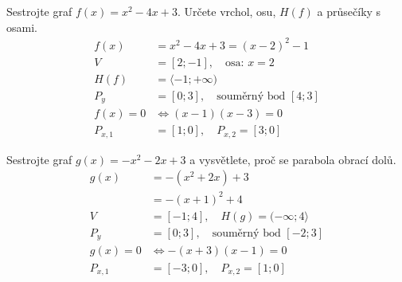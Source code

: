 \documentclass[11pt,a4paper]{article}
\begin{document}
\begin{prikladReseniBox}[title={Příklad 1}]
Sestrojte graf $f(x)=x^2-4x+3$. Určete vrchol, osu, $H(f)$ a průsečíky s osami.
\tcblower
\[
\begin{aligned}
f(x)&=x^2-4x+3=(x-2)^2-1 \\
V&=[2;-1],\quad\text{osa: }x=2 \\
H(f)&=\langle-1;+\infty) \\
P_y&=[0;3],\quad \text{souměrný bod }[4;3] \\
f(x)=0&\iff(x-1)(x-3)=0 \\
P_{x,1}&=[1;0],\quad P_{x,2}=[3;0]
\end{aligned}
\]

\end{prikladReseniBox}
\begin{center}
\end{center}
\begin{prikladReseniBox}[title={Příklad 2}]
Sestrojte graf $g(x)=-x^2-2x+3$ a vysvětlete, proč se parabola obrací dolů.
\tcblower
\[
\begin{aligned}
g(x)&=-(x^2+2x)+3 \\
&=-(x+1)^2+4 \\
V&=[-1;4],\quad H(g)=(-\infty;4\rangle \\
P_y&=[0;3],\quad\text{souměrný bod }[-2;3] \\
g(x)=0&\iff -(x+3)(x-1)=0 \\
P_{x,1}&=[-3;0],\quad P_{x,2}=[1;0]
\end{aligned}
\]

\end{prikladReseniBox}
\end{document}
